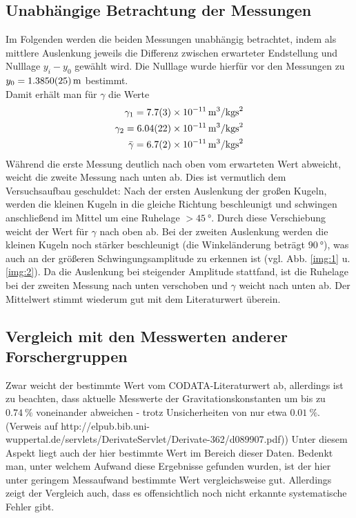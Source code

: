 \subsection{Unabhängige Betrachtung der Messungen}
Im Folgenden werden die beiden Messungen unabhängig betrachtet, indem als mittlere Auslenkung jeweils die Differenz zwischen erwarteter Endstellung und Nulllage $y_i-y_0$ gewählt wird. Die Nulllage wurde hierfür vor den Messungen zu $y_0=\SI{1,385\pm0,0025}{\meter}$ bestimmt.\\
Damit erhält man für $\gamma$ die Werte
\begin{align}
\gamma_1=\SI[per-mode = fraction]{7,7\pm0,3e-11}{\m^{3}\per\kg\s\squared}\\
\gamma_2=\SI[per-mode = fraction]{6,04\pm0,22e-11}{\m^{3}\per\kg\s\squared}\\
\bar{\gamma}=\SI[per-mode = fraction]{6,7\pm0,2e-11}{\m^{3}\per\kg\s\squared}
\end{align}
Während die erste Messung deutlich nach oben vom erwarteten Wert abweicht, weicht die zweite Messung nach unten ab. Dies ist vermutlich dem Versuchsaufbau geschuldet: Nach der ersten Auslenkung der großen Kugeln, werden die kleinen Kugeln in die gleiche Richtung beschleunigt und schwingen anschließend im Mittel um eine Ruhelage $>\SI{45}{\degree}$. Durch diese Verschiebung weicht der Wert für $\gamma$ nach oben ab. Bei der zweiten Auslenkung werden die kleinen Kugeln noch stärker beschleunigt (die Winkeländerung beträgt $\SI{90}{\degree}$), was auch an der größeren Schwingungsamplitude zu erkennen ist (vgl. Abb. \ref{img:1} u. \ref{img:2}). Da die Auslenkung bei steigender Amplitude stattfand, ist die Ruhelage bei der zweiten Messung nach unten verschoben und $\gamma$ weicht nach unten ab. Der Mittelwert stimmt wiederum gut mit dem Literaturwert überein.
\subsection{Vergleich mit den Messwerten anderer Forschergruppen}
Zwar weicht der bestimmte Wert vom CODATA-Literaturwert ab, allerdings ist zu beachten, dass aktuelle Messwerte der Gravitationskonstanten um bis zu $\SI{0,74}{\percent}$ voneinander abweichen - trotz Unsicherheiten von nur etwa $\SI{0,01}{\percent}$.(Verweis auf http://elpub.bib.uni-wuppertal.de/servlets/DerivateServlet/Derivate-362/d089907.pdf))
Unter diesem Aspekt liegt auch der hier bestimmte Wert im Bereich dieser Daten. Bedenkt man, unter welchem Aufwand diese Ergebnisse gefunden wurden, ist der hier unter geringem Messaufwand bestimmte Wert vergleichsweise gut. Allerdings zeigt der Vergleich auch, dass es offensichtlich noch nicht erkannte systematische Fehler gibt.